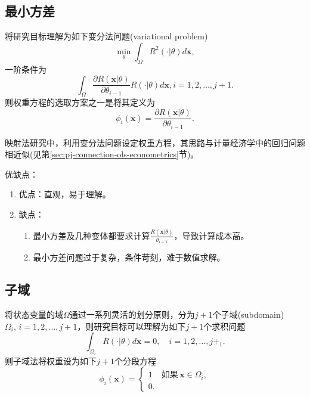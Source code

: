 \subsection{最小方差}
\label{sec:pj-weight-least-squares}
将研究目标理解为如下变分法问题(variational problem)
\begin{equation*}
  \min_{\theta} \int_{\Omega} R^2 \left( \cdot | \theta \right) d \bm{x},
\end{equation*}
一阶条件为
\begin{equation*}
  \int_{\Omega} \frac{\partial R(\bm{x} | \theta)}{ \partial \theta_{i-1}} R(\cdot | \theta) d \bm{x}, i=1,2,\ldots,j+1.
\end{equation*}
则权重方程的选取方案之一是将其定义为
\begin{equation}
  \phi_{i}(\bm{x}) = \frac{\partial R(\bm{x} | \theta)}{ \partial \theta_{i-1}}.
\end{equation}

映射法研究中，利用变分法问题设定权重方程，其思路与计量经济学中的回归问题相近似(见第\ref{sec:pj-connection-ols-econometrics}节)。

优缺点：
\begin{enumerate}
  \item 优点：直观，易于理解。
  \item 缺点：
  \begin{enumerate}
    \item 最小方差及几种变体都要求计算$\frac{R(\bm{x}|\theta)}{\theta_{i-1}}$，导致计算成本高。
    \item 最小方差问题过于复杂，条件苛刻，难于数值求解。
  \end{enumerate}
\end{enumerate}

\subsection{子域}
\label{sec:pj-weight-subdomain}
将状态变量的域$\Omega$通过一系列灵活的划分原则，分为$j+1$个子域(subdomain) $\Omega_i, \, i=1,2,\ldots,j+1$，则研究目标可以理解为如下$j+1$个求积问题
\begin{equation*}
  \int_{\Omega_i} R(\cdot | \theta) d \bm{x} = 0, \quad i=1,2,\ldots,j+_1.
\end{equation*}
则子域法将权重设为如下$j+1$个分段方程
\begin{equation*}
  \phi_i(\bm{x}) = \begin{cases}
  1 & \text{如果}\, \bm{x} \in \Omega_i,\\
  0.
  \end{cases}
\end{equation*}

